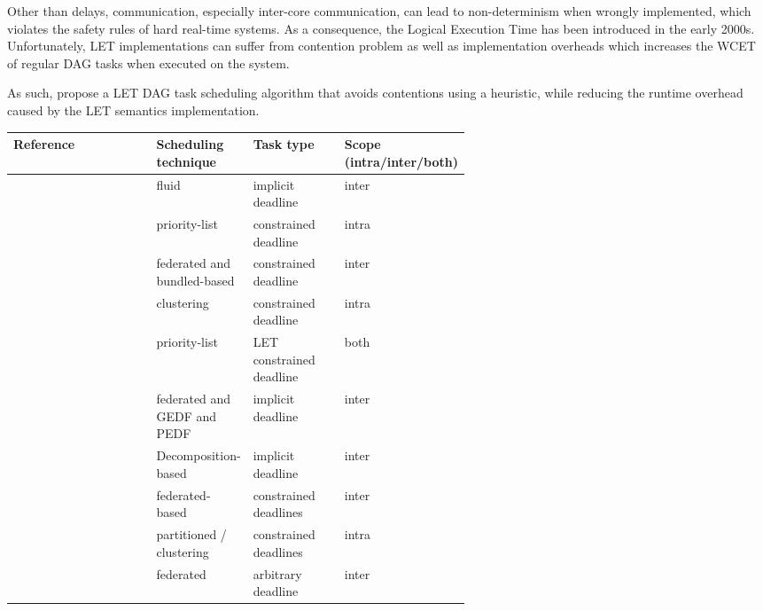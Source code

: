 Other than delays, communication, especially inter-core communication,
can lead to non-determinism when wrongly implemented,
which violates the safety rules of hard real-time systems.
As a consequence, the Logical Execution Time has been 
introduced in the early 2000s\cite{henzinger2003giotto}.
Unfortunately, LET implementations can suffer from contention problem
as well as implementation overheads
which increases the WCET of regular DAG tasks when executed on the system.

As such, \cite{Igarashi2020HeuristicContentionFree}
propose a LET DAG task scheduling algorithm that
avoids contentions using a heuristic, while reducing the runtime
overhead caused by the LET semantics implementation.


\begin{table}
    \centering
    \begin{tabular}[]{|l|p{0.20\linewidth}|p{0.20\linewidth}|p{0.20\linewidth}|}
        \hline
        \textbf{Reference} & \textbf{Scheduling technique} & \textbf{Task type} & \textbf{Scope (intra/inter/both)}\\
        \hline
        \cite{guan2021DAGfluid} & fluid & implicit deadline & inter\\
        \hline
        \cite{He2019DagIntra} & priority-list & constrained deadline & intra \\
        \hline
        \cite{Kobayashi2023FedBundledDagsched} & federated and bundled-based & constrained deadline & inter\\
        \hline
        \cite{Xiao2019}  & clustering & constrained deadline & intra\\ 
        \hline
        \cite{Igarashi2020HeuristicContentionFree}  & priority-list & LET constrained deadline & both \\
        \hline
        \cite{jiangUtilTensityBound}  & federated and GEDF and PEDF & implicit deadline & inter\\
        \hline
        \cite{JiangDecompoSchedParallelTask} & Decomposition-based & implicit deadline & inter \\
        \hline
        \cite{He2023DegreeOfParallelism} & federated-based & constrained deadlines & inter \\
        \hline
        \cite{Shi2024DagExecGroups}  & partitioned / clustering & constrained deadlines & intra\\
        \hline
        \cite{Guan2023FederatedNew}  & federated & arbitrary deadline & inter\\
        \hline

\end{tabular}
\end{table}
